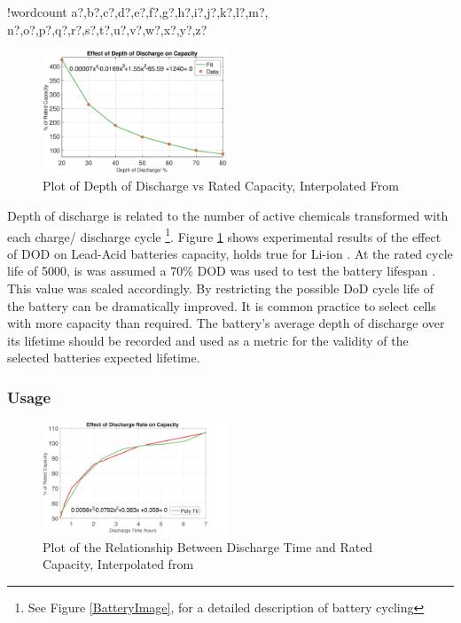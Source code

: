 \documentclass[fontsize=9.5pt]{extarticle}
\numberwithin{figure}{section} %
\newcounter{words}
\newenvironment{counted}{%
  \setcounter{words}{0}
  \SearchList!{wordcount}{\stepcounter{words}}
    {a?,b?,c?,d?,e?,f?,g?,h?,i?,j?,k?,l?,m?,
    n?,o?,p?,q?,r?,s?,t?,u?,v?,w?,x?,y?,z?}
  \UndoBoundary{'}
  \SearchOrder{p;}}{%
  \StopSearching}
\begin{document}
\begin{counted}
\begin{figure}
\vspace{-40pt}
  \begin{center}
\includegraphics[trim = 0 0 0 0, clip, width=0.49\textwidth]{dodplot22.eps}
  \end{center}
    \vspace{-5pt}
  \caption{Plot of Depth of Discharge vs Rated Capacity, Interpolated From \cite{BatteryL10:online}}
  \label{dodLog}
  \vspace{-10pt}
\end{figure}

Depth of discharge is related to the number of active chemicals
transformed with each charge/ discharge cycle
\footnote{See Figure \ref{BatteryImage}, for a detailed description of battery cycling}.
Figure \ref{dodLog} shows experimental results of the effect of DOD on
Lead-Acid batteries capacity, holds true for Li-ion
\cite{BatteryL10:online}. At the rated cycle life of 5000, is was
assumed a 70\% DOD was used to test the battery lifespan
\cite{Teslawil27:online}. This value was scaled accordingly. By
restricting the possible DoD cycle life of the battery can be
dramatically improved. It is common practice to select cells with more
capacity than required. The battery's average depth of discharge over
its lifetime should be recorded and used as a metric for the validity of
the selected batteries expected lifetime.

\subsubsection{Usage}\label{usage}

\begin{figure}
\vspace{-40pt}
  \begin{center}
\includegraphics[trim = 0 0 10 0, clip, width=0.49\textwidth]{dischargetime.pdf}
\vspace{-5pt}
  \caption{Plot of the Relationship Between Discharge Time and Rated Capacity, Interpolated from \cite{Effectso69:online}}
    \end{center}
  \label{disRate}
  \vspace{-20pt}
\end{figure}


\end{counted}
\end{document}
